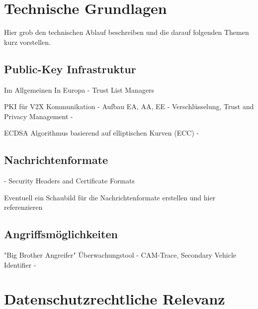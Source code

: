 
\section{Technische Grundlagen}
\label{ch:FirstContentSection}


Hier grob den technischen Ablauf beschreiben und die darauf folgenden Themen kurz vorstellen.

\subsection{Public-Key Infrastruktur}
\label{sec:FirstContentSection:FirstSubSection}
Im Allgemeinen
In Europa - Trust List Managers

PKI für V2X Kommunikation - Aufbau EA, AA, EE - \cite{Strubbe2017}
Verschlüsselung, Trust and Privacy Management - \cite{ETSI2018}

ECDSA Algorithmus basierend auf elliptischen Kurven (ECC) - \cite{Barker2013}

\subsection{Nachrichtenformate}
\label{sec:FirstContentSection:SecondSubSection}

\cite{ETSI2013} - Security Headers and Certificate Formats

Eventuell ein Schaubild für die Nachrichtenformate erstellen und hier referenzieren

\subsection{Angriffsmöglichkeiten}
\label{sec:FirstContentSection:ThirdSubSection}

"Big Brother Angreifer" \cite{Wiedersheim2010}
Überwachungstool - CAM-Trace, 
Secondary Vehicle Identifier - \cite{Ullmann2016}

\section{Datenschutzrechtliche Relevanz}
\label{ch:SecondContentSection}

